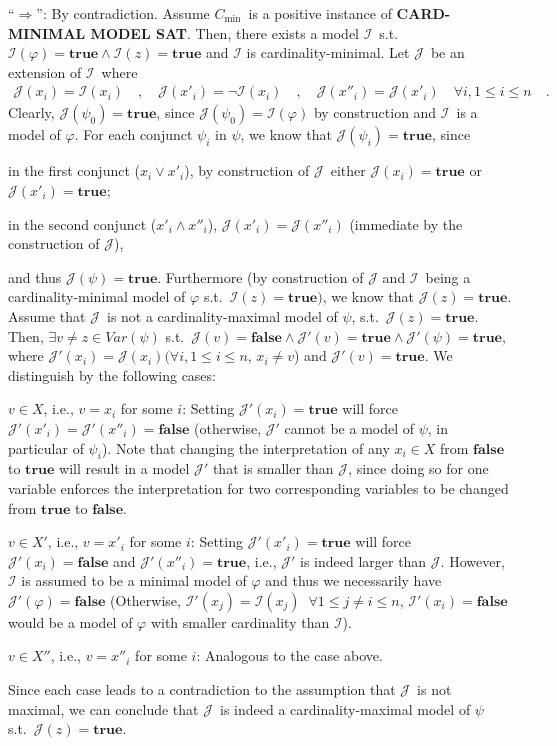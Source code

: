 \documentclass [11pt]{article}
\renewcommand{\phi}{\varphi}
\newcommand{\True}{\mathbf{true}}
\newcommand{\False}{\mathbf{false}}
\newcommand{\MINCARDSAT}{\textbf{CARD-MINIMAL MODEL SAT}}
\newcommand{\mI}{\ensuremath{\mathcal{I}}}
\newcommand{\mJ}{\ensuremath{\mathcal{J}}}
\newcommand{\mIp}{\ensuremath{\mathcal{I}'}}
\newcommand{\mJp}{\ensuremath{\mathcal{J}'}}
\newcommand{\fai}{\ensuremath{\forall i, 1 \leq i \leq n}}
\newcommand{\Cmin}{\ensuremath{C_\text{min}}}
\begin{document}
``$\Rightarrow$'': By contradiction. 
Assume \Cmin\ is a positive instance of \MINCARDSAT. 
Then, there exists a model \mI\ s.t.\ $\mI(\phi) = \True \land \mI(z) = \True$ and $\mI$ is cardinality-minimal.
Let \mJ\ be an extension of \mI\, where 
\begin{align*}
\mJ(x_i) = \mI(x_i) \quad , \quad \mJ(x'_i) = \neg \mI(x_i) \quad , \quad \mJ(x''_i) = \mJ(x'_i) \quad \fai \quad .
\end{align*}
Clearly, $\mJ(\psi_0) = \True$, since $\mJ(\psi_0) = \mI(\phi)$ by construction and \mI\ is a model of $\phi$. 
For each conjunct $\psi_i$ in $\psi$, we know that $\mJ(\psi_i) = \True$, since  
\begin{compactitem}
\item in the first conjunct ($x_i \lor x'_i$), by construction of \mJ\, either $\mJ(x_i) = \True$ or $\mJ(x'_i) = \True$;
\item in the second conjunct ($x'_i \land x''_i$), $\mJ(x'_i) = \mJ(x''_i)$ (immediate by the construction of \mJ),
\end{compactitem}
and thus $\mJ(\psi) = \True$.
Furthermore (by construction of $\mJ$ and \mI\ being a cardinality-minimal model of $\phi$ s.t.\ $\mI(z) = \True)$, we know that $\mJ(z) = \True$.
Assume that \mJ\ is not a cardinality-maximal model of $\psi$, s.t.\ $\mJ(z) = \True$.
Then, $\exists v\neq z \in Var(\psi)$ s.t.\ $\mJ(v) = \False \land \mJp(v) = \True \land \mJp(\psi) =\True$, where $\mJp(x_i) = \mJ(x_i) (\fai$, $x_i\neq v$) and $\mJp(v) = \True$.
We distinguish by the following cases:
\begin{compactitem}
\item $v\in X$, i.e., $v = x_i$ for some $i$: Setting $\mJp(x_i) = \True$ will force $\mJp(x'_i) = \mJp(x''_i) = \False$ (otherwise, $\mJp$ cannot be a model of $\psi$, in particular of $\psi_i$).
Note that changing the interpretation of any $x_i \in X$ from $\False$ to $\True$ will result in a model $\mJp$ that is smaller than $\mJ$, since doing so for one variable enforces the interpretation for two corresponding variables to be changed from $\True$ to $\False$.
\item $v \in X'$, i.e., $v = x'_i$ for some $i$: Setting $\mJp(x'_i) = \True$ will force $\mJp(x_i) = \False$ and $\mJp(x''_i) = \True$, i.e., $\mJp$ is indeed larger than $\mJ$. 
However, $\mI$ is assumed to be a minimal model of $\phi$ and thus we necessarily have $\mJp(\phi) = \False$ (Otherwise, $\mIp(x_j) = \mI(x_j) \;\; \forall 1 \leq j\neq i\leq n$, $\mIp(x_i) = \False$ would be a model of $\phi$ with smaller cardinality than $\mI$).
\item $v \in X''$, i.e., $v = x''_i$ for some $i$: Analogous to the case above.
\end{compactitem}
Since each case leads to a contradiction to the assumption that \mJ\ is not maximal, we can conclude that \mJ\ is indeed a cardinality-maximal model of $\psi$ s.t.\ $\mJ(z) = \True$.
 
\end{document}
